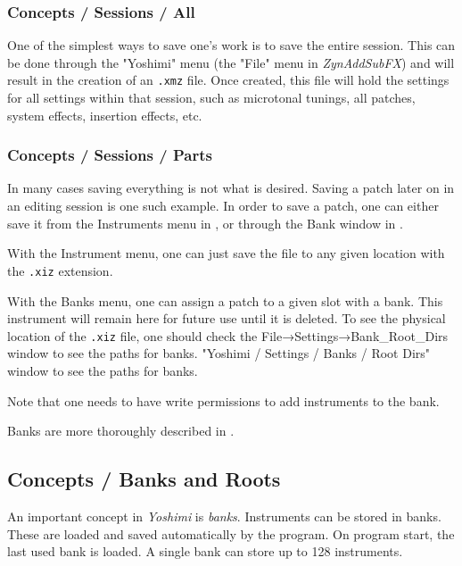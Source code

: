 \subsubsection{Concepts / Sessions / All}
\label{subsec:concepts_sessions_all}

   One of the simplest ways to save one's work is to save the entire session.
   This can be done through the "Yoshimi" menu (the "File" menu in
   \textsl{ZynAddSubFX}) and will result in the creation of
   an \texttt{.xmz} file. Once created, this file will hold the settings for
   all settings within that session, such as microtonal tunings, all
   patches, system effects, insertion effects, etc.

\subsubsection{Concepts / Sessions / Parts}
\label{subsec:concepts_sessions_parts}

   In many cases saving everything is not what is desired. Saving a patch
   later on in an editing session is one such example.
   In order to save a patch, one can either save it from the Instruments menu
   in ,
   or through the Bank window in
   .

   With the Instrument menu, one can just save the file to any given location
   with the \texttt{.xiz} extension.

   With the Banks menu, one can assign a patch to a given slot with a bank.
   This instrument will remain here for future use until it is deleted. To
   see the physical location of the \texttt{.xiz} file, one should check the
   File→Settings→Bank\_Root\_Dirs window to see the paths for banks.
   "Yoshimi / Settings / Banks / Root Dirs" window to see the paths for
   banks.

   Note that one needs to have write permissions to add instruments to the
   bank.

   Banks are more thoroughly described in
   .

\subsection{Concepts / Banks and Roots}
\label{subsec:concepts_banks_and_roots}

   An important concept in \textsl{Yoshimi} is \textsl{banks}.  Instruments
   can be stored in banks. These are loaded and saved automatically by the
   program.  On program start, the last used bank is loaded. A single bank
   can store up to 128 instruments. 


